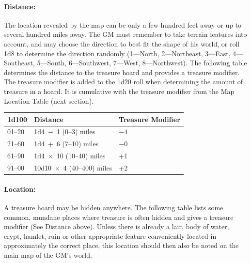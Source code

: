 \begin{multicols}{2}
\begin{minipage}{\columnwidth}
\end{minipage}

\paragraph{Distance:} The location revealed by the map can be only a few hundred feet away or up to several hundred miles away.  The GM must remember to take terrain features into account, and may choose the direction to best fit the shape of his world, or roll 1d8 to determine the direction randomly (1---North, 2---Northeast, 3---East, 4---Southeast, 5---South, 6---Southwest, 7---West, 8---Northwest).  The following table determines the distance to the treasure hoard and provides a treasure modifier.  The treasure modifier is added to the 1d20 roll when determining the amount of treasure in a hoard.  It is cumulative with the treasure modifier from the Map Location Table (next section).

\noindent
\begin{minipage}{\columnwidth}

\label{mapdistance}
\noindent
\begin{tabular}{|p{}|p{}|p{}|}
\hline
1d100	& Distance	& Treasure Modifier \\
\hline\hline
\rowcolor[gray]{.9}01--20	& 1d4~$-$~1 (0--3) miles	& $-4$ \\
21--60	& 1d4~+~6 (7--10) miles	& $-0$ \\
\rowcolor[gray]{.9}61--90	& 1d4~$\times$~10 (10--40) miles	& +1 \\
91--00	& 10d10~$\times$~4 (40--400) miles	& +2 \\
\hline
\end{tabular}

\end{minipage}

\paragraph{Location:} A treasure hoard may be hidden anywhere.  The following table lists some common, mundane places where treasure is often hidden and gives a treasure modifier (See Distance above).  Unless there is already a lair, body of water, crypt, hamlet, ruin or other appropriate feature conveniently located in approximately the correct place, this location should then also be noted on the main map of the GM's world.


\end{multicols}
